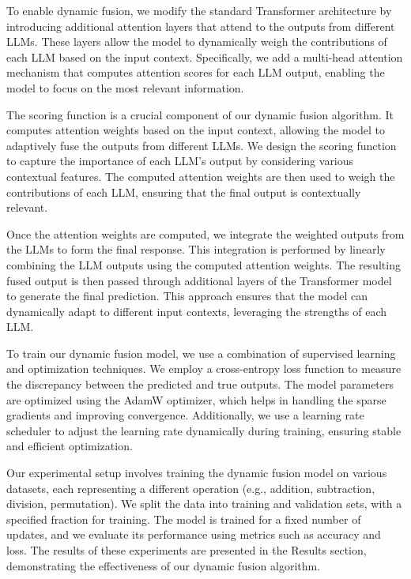 \documentclass{article} %
\begin{document}
To enable dynamic fusion, we modify the standard Transformer architecture by introducing additional attention layers that attend to the outputs from different LLMs. These layers allow the model to dynamically weigh the contributions of each LLM based on the input context. Specifically, we add a multi-head attention mechanism that computes attention scores for each LLM output, enabling the model to focus on the most relevant information.

The scoring function is a crucial component of our dynamic fusion algorithm. It computes attention weights based on the input context, allowing the model to adaptively fuse the outputs from different LLMs. We design the scoring function to capture the importance of each LLM's output by considering various contextual features. The computed attention weights are then used to weigh the contributions of each LLM, ensuring that the final output is contextually relevant.

Once the attention weights are computed, we integrate the weighted outputs from the LLMs to form the final response. This integration is performed by linearly combining the LLM outputs using the computed attention weights. The resulting fused output is then passed through additional layers of the Transformer model to generate the final prediction. This approach ensures that the model can dynamically adapt to different input contexts, leveraging the strengths of each LLM.

To train our dynamic fusion model, we use a combination of supervised learning and optimization techniques. We employ a cross-entropy loss function to measure the discrepancy between the predicted and true outputs. The model parameters are optimized using the AdamW optimizer, which helps in handling the sparse gradients and improving convergence. Additionally, we use a learning rate scheduler to adjust the learning rate dynamically during training, ensuring stable and efficient optimization.

Our experimental setup involves training the dynamic fusion model on various datasets, each representing a different operation (e.g., addition, subtraction, division, permutation). We split the data into training and validation sets, with a specified fraction for training. The model is trained for a fixed number of updates, and we evaluate its performance using metrics such as accuracy and loss. The results of these experiments are presented in the Results section, demonstrating the effectiveness of our dynamic fusion algorithm.
\end{document}
